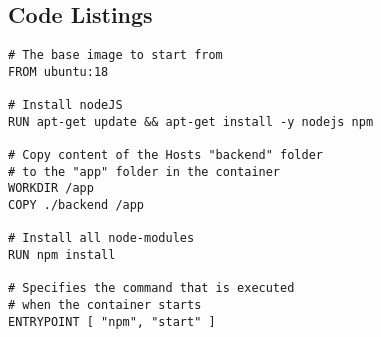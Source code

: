 
\subsection{Code Listings}
\begin{lstlisting}[language=docker, frame=single, caption={Exemplary NodeJS Dockerfile},label=code::docker]
# The base image to start from
FROM ubuntu:18

# Install nodeJS
RUN apt-get update && apt-get install -y nodejs npm

# Copy content of the Hosts "backend" folder
# to the "app" folder in the container
WORKDIR /app
COPY ./backend /app

# Install all node-modules
RUN npm install

# Specifies the command that is executed
# when the container starts
ENTRYPOINT [ "npm", "start" ]

\end{lstlisting}

